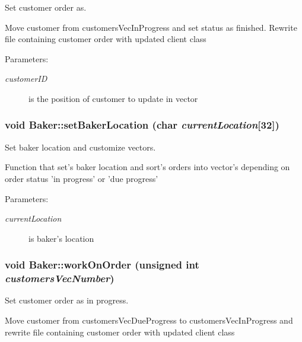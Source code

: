 Set customer order as. 

Move customer from customers\-Vec\-In\-Progress and set status as finished. Rewrite file containing customer order with updated client class

\begin{Desc}
\item[Parameters:]
\begin{description}
\item[{\em customer\-ID}]is the position of customer to update in vector \end{description}
\end{Desc}
\hypertarget{class_baker_b85151ecb20282d81b4dab489fea7dd8}{
\subsubsection[setBakerLocation]{\setlength{\rightskip}{0pt plus 5cm}void Baker::set\-Baker\-Location (char {\em current\-Location}\mbox{[}32\mbox{]})}}
\label{class_baker_b85151ecb20282d81b4dab489fea7dd8}


Set baker location and customize vectors. 

Function that set's baker location and sort's orders into vector's depending on order status 'in progress' or 'due progress'

\begin{Desc}
\item[Parameters:]
\begin{description}
\item[{\em current\-Location}]is baker's location \end{description}
\end{Desc}
\hypertarget{class_baker_9616413c80f3814907a9c2399ac50438}{
\subsubsection[workOnOrder]{\setlength{\rightskip}{0pt plus 5cm}void Baker::work\-On\-Order (unsigned int {\em customers\-Vec\-Number})}}
\label{class_baker_9616413c80f3814907a9c2399ac50438}


Set customer order as in progress. 

Move customer from customers\-Vec\-Due\-Progress to customers\-Vec\-In\-Progress and rewrite file containing customer order with updated client class

